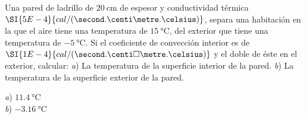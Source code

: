 \setcounter{figure}{0}
%
\begin{Exercise}
  Una pared de ladrillo de $\SI{20}{\centi\metre}$ de espesor y conductividad térmica $\SI{5E-4}{cal/(\second.\centi\metre.\celsius)}$, separa una habitación en la que el aire tiene una temperatura de $\SI{15}{\celsius}$, del exterior que tiene una temperatura de $\SI{-5}{\celsius}$. Si el coeficiente de convección interior es de $\SI{1E-4}{cal/(\second.\centi\square\metre.\celsius)}$ y el doble de  éste en el exterior, calcular: \textit{a}) La temperatura de la superficie interior de la pared. \textit{b}) La temperatura de la superficie exterior de la pared.
\begin{Answer}
  \begin{minipage}[t]{.4\textwidth}
    \textit{a}) $\SI{11.4}{\celsius}$\\ \textit{b}) $\SI{-3.16}{\celsius}$
  \end{minipage}
\end{Answer}
%
\end{Exercise}
